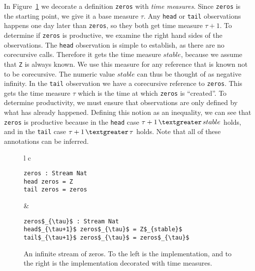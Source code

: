 In Figure~\ref{fig:zeros} we decorate a definition \texttt{zeros} with \emph{time measures}. Since \texttt{zeros} is the starting point, we give it a base measure $\tau$. Any \texttt{head} or \texttt{tail} observations happens one day later than \texttt{zeros}, so they both get time measure $\tau+1$. To determine if \texttt{zeros} is productive, we examine the right hand sides of the observations. The \texttt{head} observation is simple to establish, as there are no corecursive calls. Therefore it gets the time measure $stable$, because we assume that \texttt{Z} is always known. We use this measure for any reference that is known not to be corecursive. The numeric value $stable$ can thus be thought of as negative infinity. In the \texttt{tail} observation we have a corecursive reference to \texttt{zeros}. This gets the time measure $\tau$ which is the time at which \texttt{zeros} is ``created''. To determine productivity, we must ensure that observations are only defined by what has already happened. Defining this notion as an inequality, we can see that \texttt{zeros} is productive because in the \texttt{head} case $\tau+1\,\textgreater\,stable$ holds, and in the \texttt{tail} case $\tau+1\,\textgreater\,\tau$ holds. Note that all of these annotations can be inferred.

\begin{figure}
\begin{tabular}{l c}

\begin{minipage}{3in}
\begin{Verbatim}[commandchars=\\\{\},codes={\catcode`$=3\catcode`_=8}]
zeros : Stream Nat
head zeros = Z
tail zeros = zeros
\end{Verbatim}
\end{minipage} &
\begin{minipage}{3in}
\begin{Verbatim}[commandchars=\\\{\},codes={\catcode`$=3\catcode`_=8}]
zeros$_{\tau}$ : Stream Nat
head$_{\tau+1}$ zeros$_{\tau}$ = Z$_{stable}$
tail$_{\tau+1}$ zeros$_{\tau}$ = zeros$_{\tau}$
\end{Verbatim}
\end{minipage}

\end{tabular}
\caption{An infinite stream of zeros. To the left is the implementation, and to the right is the implementation decorated with time measures.}
\label{fig:zeros}
\end{figure}

